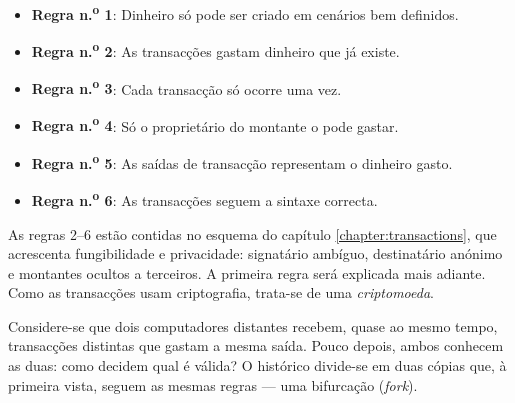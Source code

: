 
\begin{itemize}
    \item[] \textbf{Regra n.\textsuperscript{o} 1}: Dinheiro só pode ser criado em cenários bem definidos.
    \item[] \textbf{Regra n.\textsuperscript{o} 2}: As transacções gastam dinheiro que já existe.
    \item[] \textbf{Regra n.\textsuperscript{o} 3}: Cada transacção só ocorre uma vez.
    \item[] \textbf{Regra n.\textsuperscript{o} 4}: Só o proprietário do montante o pode gastar.
    \item[] \textbf{Regra n.\textsuperscript{o} 5}: As saídas de transacção representam o dinheiro gasto.
    \item[] \textbf{Regra n.\textsuperscript{o} 6}: As transacções seguem a sintaxe correcta.
\end{itemize}

As regras 2--6 estão contidas no esquema do capítulo
\ref{chapter:transactions}, que acrescenta fungibilidade e privacidade:
signatário ambíguo, destinatário anónimo e montantes ocultos a terceiros. A
primeira regra será explicada mais adiante. Como as transacções usam
criptografia, trata-se de uma \emph{criptomoeda}.


Considere-se que dois computadores distantes recebem, quase ao mesmo tempo,
transacções distintas que gastam a mesma saída. Pouco depois, ambos conhecem as
duas: como decidem qual é válida? O histórico divide-se em duas cópias que, à
primeira vista, seguem as mesmas regras --- uma bifurcação ({\em fork}).


